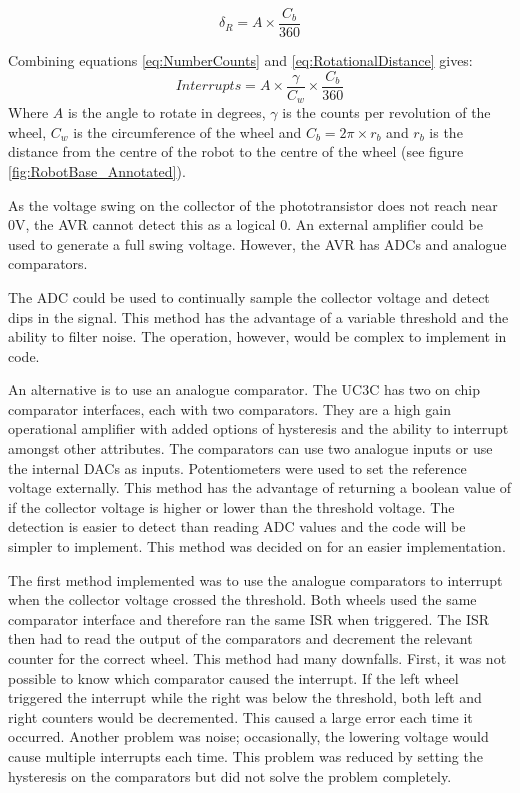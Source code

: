 \begin{equation}
\label{eq:RotationalDistance}
\delta_{R} = A \times \frac{C_b}{360}
\end{equation}

Combining equations \eqref{eq:NumberCounts} and \eqref{eq:RotationalDistance} gives:
\begin{equation}
\label{eq:RotationalInterrupts}
Interrupts = A \times \frac{\gamma}{C_w} \times \frac{C_b}{360}
\end{equation}
Where $A$ is the angle to rotate in degrees, $\gamma$ is the counts per revolution of the wheel, $C_w$ is the circumference of the wheel and $C_b = 2\pi\times r_b$ and $r_b$ is the distance from the centre of the robot to the centre of the wheel (see figure \ref{fig:RobotBase_Annotated}).


As the voltage swing on the collector of the phototransistor does not reach near 0V, the AVR cannot detect this as a logical 0. An external amplifier could be used to generate a full swing voltage. However, the AVR has ADCs and analogue comparators. 

The ADC could be used to continually sample the collector voltage and detect dips in the signal. This method has the advantage of a variable threshold and the ability to filter noise. The operation, however, would be complex to implement in code. 

An alternative is to use an analogue comparator. The UC3C has two on chip comparator interfaces, each with two comparators. They are a high gain operational amplifier with added options of hysteresis and the ability to interrupt amongst other attributes. The comparators can use two analogue inputs or use the internal DACs as inputs. Potentiometers were used to set the reference voltage externally. %
This method has the advantage of returning a boolean value of if the collector voltage is higher or lower than the threshold voltage. The detection is easier to detect than reading ADC values and the code will be simpler to implement. This method was decided on for an easier implementation.

The first method implemented was to use the analogue comparators to interrupt when the collector voltage crossed the threshold. Both wheels used the same comparator interface and therefore ran the same ISR when triggered. The ISR then had to read the output of the comparators and decrement the relevant counter for the correct wheel. This method had many downfalls. First, it was not possible to know which comparator caused the interrupt. If the left wheel triggered the interrupt while the right was below the threshold, both left and right counters would be decremented. This caused a large error each time it occurred. Another problem was noise; occasionally, the lowering voltage would cause multiple interrupts each time. This problem was reduced by setting the hysteresis on the comparators but did not solve the problem completely. 

